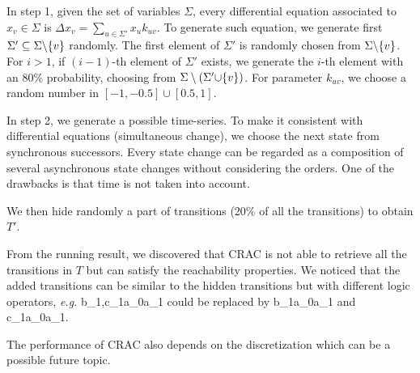 In step 1, given the set of variables $\Sigma$, every differential equation associated to $x_v\in \Sigma$ is $\Delta x_v=\sum_{u\in \Sigma'}x_u k_{uv}$. 
To generate such equation, we generate first $\Sigma'\subseteq \Sigma\miset{v}$ randomly.
The first element of $\Sigma'$ is randomly chosen from $\Sigma\miset{v}$.
For $i>1$, if $(i-1)$-th element of $\Sigma'$ exists, we generate the $i$-th element with an 80\% probability, choosing from $\Sigma\setminus(\Sigma'\addset{v})$.
For parameter $k_{uv}$, we choose a random number in $[-1,-0.5]\cup[0.5,1]$.

In step 2, we generate a possible time-series.
To make it consistent with differential equations (simultaneous change), we choose the next state from synchronous successors.
Every state change can be regarded as a composition of several asynchronous state changes without considering the orders.
One of the drawbacks is that time is not taken into account.

We then hide randomly a part of transitions (20\% of all the transitions) to obtain $T'$. %

From the running result, we discovered that CRAC is not able to retrieve all the transitions in $T$ but can satisfy the reachability properties.
We noticed that the added transitions can be similar to the hidden transitions but with different logic operators, \textit{e.g.} \ac{b_1,c_1}{a_0}{a_1} could be replaced by \ac{b_1}{a_0}{a_1} and \ac{c_1}{a_0}{a_1}.

The performance of CRAC also depends on the discretization  which can be a possible future topic.


